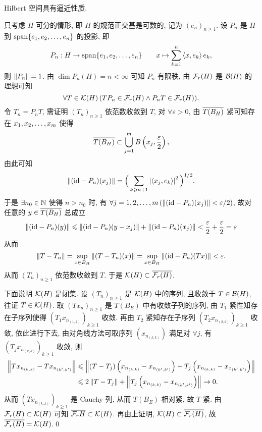 \begin{Theorem}
	Hilbert 空间具有逼近性质.
\end{Theorem}
\begin{Proof}
	只考虑 $ H $ 可分的情形, 即 $ H $ 的规范正交基是可数的, 记为 $ (e_{n})_{n\geqslant1} $. 设 $ P_{n} $ 是 $ H $ 到 $ \Span\{ \seq{e} \} $ 的投影, 即
	\[
		P_{n}: H\to\Span\{ \seq{e} \}\qquad x\mapsto \sum_{k=1}^{n}\lrangle{x, e_{k}}e_{k},
	\]
	则 $ \norm{P_{n}}=1 $. 由 $ \dim P_{n}(H)=n<\infty $ 可知 $ P_{n} $ 有限秩, 由 $ \Fr(H) $ 是 $ \CB(H) $ 的理想可知
	\[
		\forall T\in\CK(H)\,(TP_{n}\in\Fr(H)\land P_{n}T\in\Fr(H)).
	\]
	令 $ T_{n}=P_{n}T $, 需证明 $ (T_{n})_{n\geqslant1} $ 依范数收敛到 $ T $, 对 $ \forall\varepsilon>0 $, 由 $ \baro{T(B_{H})} $ 紧可知存在 $ \seq[m]{x} $ 使得
	\[
		\baro{T(B_{H})}\subset\bigcup_{j=1}^{m}B\left(x_{j}, \frac{\varepsilon}{2}\right),
	\]
	由此可知
	\[
		\norm{(\id -P_{n})(x_{j})}=\Big( \sum_{k\geqslant n+1} \abs{\lrangle{x_{j}, e_{k}}}^{2} \Big)^{1/2}.
	\]
	于是 $ \exists n_{0}\in\N $ 使得 $ n>n_{0} $ 时, 有 $ \forall j= 1, 2, \dots, m\,(\norm{(\id-P_{n})(x_{j})}<\varepsilon/2) $, 故对任意的 $ y\in\baro{T(B_{H})} $ 总成立
	\[
		\norm{(\id-P_{n})(y)}\leqslant\norm{(\id-P_{n})(y-x_{j})}+\norm{(\id-P_{n})(x_{j})}<\frac{\varepsilon}{2}+\frac{\varepsilon}{2}=\varepsilon
	\]
	从而
	\[
		\norm{T-T_{n}}=\sup_{x\in B_{H}}\norm{(T-T_{n})(x)}=\sup_{x\in B_{H}}\norm{(\id-P_{n})(Tx)}<\varepsilon.
	\]
	从而 $ (T_{n})_{n\geqslant1} $ 依范数收敛到 $ T $. 于是 $ \CK(H)\subset\baro{\Fr(H)} $.

	下面说明 $ \CK(H) $ 是闭集. 设 $ (T_{n})_{n\geqslant1} $ 是 $ \CK(H) $ 中的序列, 且收敛于 $ T\in\CB(H) $, 往证 $ T\in\CK(H) $. 取 $ (Tx_{n})_{n\geqslant1} $ 是 $ T(B_{E}) $ 中有收敛子列的序列, 由 $ T_{1} $ 紧性知存在子序列使得 $ \left(T_{1}x_{n_{(1, k)}}\right)_{k\geqslant1} $ 收敛. 再由 $ T_{2} $ 紧知存在子序列 $ \left(T_{2}x_{n_{(2, k)}}\right)_{k\geqslant1} $ 收敛, 依此进行下去, 由对角线方法可取序列 $ \left(x_{n_{(k, k)}}\right) $ 满足对 $ \forall j $, 有 $ \left(T_{j}x_{n_{(k, k)}}\right)_{k\geqslant1} $ 收敛, 则
	\[
		\begin{aligned}
			\norm{Tx_{n_{(k, k)}}-Tx_{n_{(k', k')}}} & \leqslant \norm{(T-T_{j})\left(x_{n_{(k, k)}}-x_{n_{(k', k')}}\right)+T_{j}\left(x_{n_{(k, k)}}-x_{x_{(k', k')}}\right)} \\
			                                         & \leqslant 2\norm{T-T_{j}}+\norm{T_{j}\left(x_{n_{(k, k)}}-x_{n_{(k', k')}}\right)}\to 0.
		\end{aligned}
	\]
	从而 $ \left( Tx_{n_{(k, k)}} \right)_{k\geqslant1} $ 是 Cauchy 列, 从而 $ T(B_{E}) $ 相对紧, 故 $ T $ 紧. 由 $ \Fr(H)\subset\CK(H) $ 可知 $ \baro{\Fr{H}}\subset \CK(H) $. 再由上证明, $ \CK(H)\subset\baro{\Fr(H)} $, 故 $ \baro{\Fr(H)}=\CK(H) $.\qed
\end{Proof}

